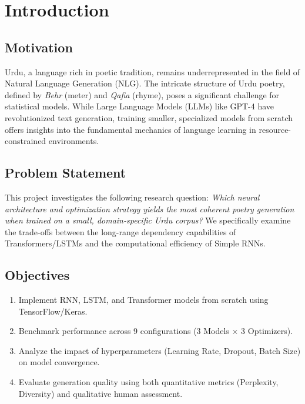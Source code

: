 \documentclass[12pt,a4paper]{article}
\begin{document}
\section{Introduction}

\subsection{Motivation}
Urdu, a language rich in poetic tradition, remains underrepresented in the field of Natural Language Generation (NLG). The intricate structure of Urdu poetry, defined by \textit{Behr} (meter) and \textit{Qafia} (rhyme), poses a significant challenge for statistical models. While Large Language Models (LLMs) like GPT-4 have revolutionized text generation, training smaller, specialized models from scratch offers insights into the fundamental mechanics of language learning in resource-constrained environments.

\subsection{Problem Statement}
This project investigates the following research question: \textit{Which neural architecture and optimization strategy yields the most coherent poetry generation when trained on a small, domain-specific Urdu corpus?} We specifically examine the trade-offs between the long-range dependency capabilities of Transformers/LSTMs and the computational efficiency of Simple RNNs.

\subsection{Objectives}
\begin{enumerate}[leftmargin=*, label=\color{secondarycolor}\arabic*.]
    \item Implement RNN, LSTM, and Transformer models from scratch using TensorFlow/Keras.
    \item Benchmark performance across 9 configurations (3 Models $\times$ 3 Optimizers).
    \item Analyze the impact of hyperparameters (Learning Rate, Dropout, Batch Size) on model convergence.
    \item Evaluate generation quality using both quantitative metrics (Perplexity, Diversity) and qualitative human assessment.
\end{enumerate}
\end{document}
